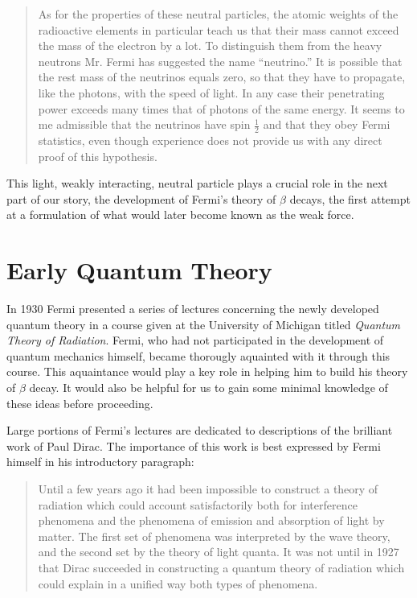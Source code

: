 \documentclass[a4paper,12pt]{book}
\begin{document}
\begin{quote}

   As for the properties of these neutral particles, the atomic weights of
the radioactive elements in particular teach us that their mass cannot
exceed the mass of the electron by a lot. To distinguish them from the
heavy neutrons Mr. Fermi has suggested the name ``neutrino.'' It is possible that the rest mass of the neutrinos equals zero, so that they have to
propagate, like the photons, with the speed of light. In any case their
penetrating power exceeds many times that of photons of the same
energy. It seems to me admissible that the neutrinos have spin $\frac{1}{2}$ and that
they obey Fermi statistics, even though experience does not provide us
with any direct proof of this hypothesis.

\end{quote}

This light, weakly interacting, neutral particle plays a crucial role in the next part of our story, the development of Fermi's theory of $\beta$ decays, the first attempt at a formulation of what would later become known as the weak force.

\section{Early Quantum Theory}

In 1930 Fermi presented a series of lectures concerning the newly developed quantum theory in a course given at the University of Michigan titled \emph{Quantum Theory of Radiation}\cite{fermi:quant}. Fermi, who had not participated in the development of quantum mechanics himself, became thorougly aquainted with it through this course. This aquaintance would play a key role in helping him to build his theory of $\beta$ decay. It would also be helpful for us to gain some minimal knowledge of these ideas before proceeding.

Large portions of Fermi's lectures are dedicated to descriptions of the brilliant work of Paul Dirac. The importance of this work is best expressed by Fermi himself in his introductory paragraph:

\begin{quote}
 Until a few years ago it had been impossible to construct a theory of radiation which could account satisfactorily both for interference phenomena and the phenomena of emission and absorption of light by matter. The first set of phenomena was interpreted by the wave theory, and the second set by the theory of light quanta. It was not until in 1927 that Dirac succeeded in constructing a quantum theory of radiation which could explain in a unified way both types of phenomena.
\end{quote}
\end{document}
